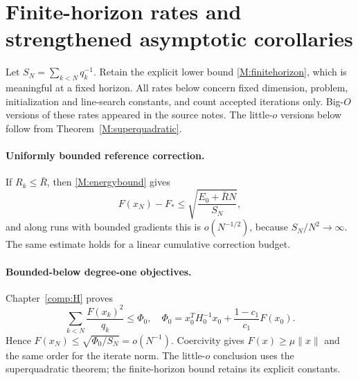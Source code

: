 

\section{Finite-horizon rates and strengthened asymptotic corollaries}

Let $S_N=\sum_{k<N}q_k^{-1}$. Retain the explicit lower bound \eqref{M:finitehorizon}, which is meaningful at a fixed horizon. All rates below concern fixed dimension, problem, initialization and line-search constants, and count accepted iterations only. Big-$O$ versions of these rates appeared in the source notes. The little-$o$ versions below follow from Theorem~\ref{M:superquadratic}.

\paragraph{Uniformly bounded reference correction.}
If $R_k\le\bar R$, then \eqref{M:energybound} gives
\[
 F(x_N)-F_*\le\sqrt{\frac{E_0+\bar RN}{S_N}},
\]
and along runs with bounded gradients this is $o(N^{-1/2})$, because $S_N/N^2\to\infty$. The same estimate holds for a linear cumulative correction budget.

\paragraph{Bounded-below degree-one objectives.}
Chapter~\ref{comp:H} proves
\[
 \sum_{k<N}\frac{F(x_k)^2}{q_k}\le\Phi_0,
\quad \Phi_0=x_0^TH_0^{-1}x_0+\frac{1-c_1}{c_1}F(x_0).
\]
Hence $F(x_N)\le\sqrt{\Phi_0/S_N}=o(N^{-1})$. Coercivity gives $F(x)\ge\mu\|x\|$ and the same order for the iterate norm. The little-$o$ conclusion uses the superquadratic theorem; the finite-horizon bound retains its explicit constants.

